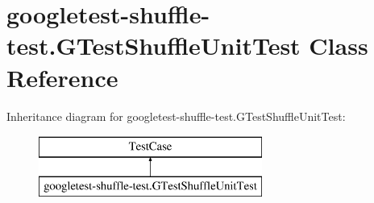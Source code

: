 \hypertarget{classgoogletest-shuffle-test_1_1_g_test_shuffle_unit_test}{}\section{googletest-\/shuffle-\/test.G\+Test\+Shuffle\+Unit\+Test Class Reference}
\label{classgoogletest-shuffle-test_1_1_g_test_shuffle_unit_test}
Inheritance diagram for googletest-\/shuffle-\/test.G\+Test\+Shuffle\+Unit\+Test\+:\begin{figure}[H]
\begin{center}
\leavevmode
\includegraphics[height=2.000000cm]{classgoogletest-shuffle-test_1_1_g_test_shuffle_unit_test}
\end{center}
\end{figure}
